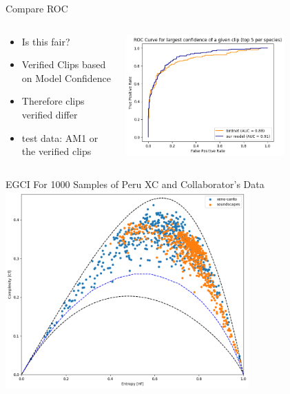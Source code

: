 \begin{frame}{Compare ROC}
    \begin{columns}
        \begin{column}{0.5\textwidth}
            \begin{itemize}
                \item Is this fair?
                \item Verified Clips based on Model Confidence
                \item Therefore clips verified differ
                \item test data: AM1 or the verified clips
            \end{itemize}
        \end{column}
        \begin{column}{0.5\textwidth}
            \includegraphics[height=0.7\textheight,width=0.7\textwidth,keepaspectratio]{./images/roc.png}
        \end{column}
    \end{columns}
\end{frame}

\begin{frame}{EGCI For 1000 Samples of Peru XC and Collaborator's Data}
    \centering
    \includegraphics[height=0.7\textheight,width=0.7\textwidth,keepaspectratio]{./images/EGCI.png}
\end{frame}


